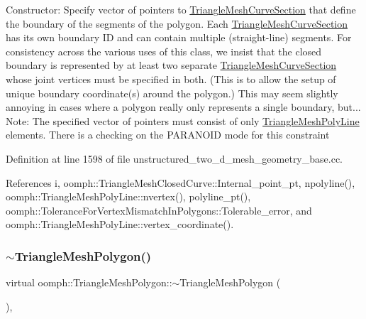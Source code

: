 Constructor\+: Specify vector of pointers to \hyperlink{classoomph_1_1TriangleMeshCurveSection}{Triangle\+Mesh\+Curve\+Section} that define the boundary of the segments of the polygon. Each \hyperlink{classoomph_1_1TriangleMeshCurveSection}{Triangle\+Mesh\+Curve\+Section} has its own boundary ID and can contain multiple (straight-\/line) segments. For consistency across the various uses of this class, we insist that the closed boundary is represented by at least two separate \hyperlink{classoomph_1_1TriangleMeshCurveSection}{Triangle\+Mesh\+Curve\+Section} whose joint vertices must be specified in both. (This is to allow the setup of unique boundary coordinate(s) around the polygon.) This may seem slightly annoying in cases where a polygon really only represents a single boundary, but... Note\+: The specified vector of pointers must consist of only \hyperlink{classoomph_1_1TriangleMeshPolyLine}{Triangle\+Mesh\+Poly\+Line} elements. There is a checking on the P\+A\+R\+A\+N\+O\+ID mode for this constraint 

Definition at line 1598 of file unstructured\+\_\+two\+\_\+d\+\_\+mesh\+\_\+geometry\+\_\+base.\+cc.



References i, oomph\+::\+Triangle\+Mesh\+Closed\+Curve\+::\+Internal\+\_\+point\+\_\+pt, npolyline(), oomph\+::\+Triangle\+Mesh\+Poly\+Line\+::nvertex(), polyline\+\_\+pt(), oomph\+::\+Tolerance\+For\+Vertex\+Mismatch\+In\+Polygons\+::\+Tolerable\+\_\+error, and oomph\+::\+Triangle\+Mesh\+Poly\+Line\+::vertex\+\_\+coordinate().

\mbox{\label{classoomph_1_1TriangleMeshPolygon_a88641d82d4b496ea61cce64045416e37}} 
\subsubsection{\texorpdfstring{$\sim$\+Triangle\+Mesh\+Polygon()}{~TriangleMeshPolygon()}}
{\footnotesize\ttfamily virtual oomph\+::\+Triangle\+Mesh\+Polygon\+::$\sim$\+Triangle\+Mesh\+Polygon (\begin{DoxyParamCaption}{ }\end{DoxyParamCaption})\hspace{0.3cm}{\ttfamily [inline]}, {\ttfamily [virtual]}}



